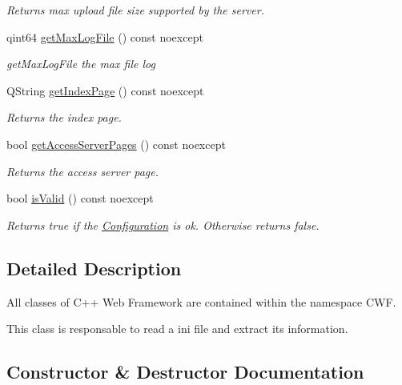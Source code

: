 \begin{DoxyCompactItemize}
\begin{DoxyCompactList}\small\item\em Returns max upload file size supported by the server. \end{DoxyCompactList}\item 
qint64 \hyperlink{class_configuration_af0ff5f0aca0bd13e5676847db77bac58}{get\+Max\+Log\+File} () const noexcept
\begin{DoxyCompactList}\small\item\em get\+Max\+Log\+File the max file log \end{DoxyCompactList}\item 
Q\+String \hyperlink{class_configuration_ab67d7ba6abdfc27f5a66042377b01cd4}{get\+Index\+Page} () const noexcept
\begin{DoxyCompactList}\small\item\em Returns the index page. \end{DoxyCompactList}\item 
bool \hyperlink{class_configuration_a28db1b4cea9169d74939107f45e18123}{get\+Access\+Server\+Pages} () const noexcept
\begin{DoxyCompactList}\small\item\em Returns the access server page. \end{DoxyCompactList}\item 
bool \hyperlink{class_configuration_aad998fe40caeeb4c412f00f0874c67c9}{is\+Valid} () const noexcept
\begin{DoxyCompactList}\small\item\em Returns true if the \hyperlink{class_configuration}{Configuration} is ok. Otherwise returns false. \end{DoxyCompactList}\end{DoxyCompactItemize}


\subsection{Detailed Description}
All classes of C++ Web Framework are contained within the namespace C\+WF. 

This class is responsable to read a ini file and extract its information. 

\subsection{Constructor \& Destructor Documentation}
\mbox{\label{class_configuration_a60b4858740fb32114fa5f4e72577fa7a}} 
